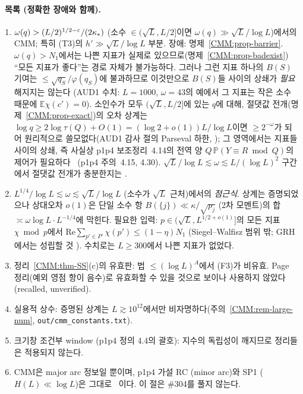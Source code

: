\paragraph{\OPEN\ 목록 (정확한 장애와 함께).}
\begin{enumerate}[label=(O\arabic*),leftmargin=2.5em]
\item $\omega(q)>(L/2)^{1/2-\varepsilon}/(2\kappa_*)$ (소수 $\in(\sqrt L,L/2]$이면 $\omega(q)\gg\sqrt L/\log L$)에서의 CMM; 특히 (T3)의 $h'\gg\sqrt L/\log L$ 부분. 장애: 명제~\ref{CMM:prop-barrier}.
 $\omega(q)>N_1$에서는 나쁜 지표가 실제로 있으므로(명제~\ref{CMM:prop-badexist}) ``모든 지표가 좋다''는 경로 자체가 불가능하다.
 그러나 그런 지표 하나의 $B(S)$ 기여는 $\le\sqrt{q_S}/\varphi(q_S)$에 불과하므로 이것만으로 $B(S)$들 사이의 상쇄가 \emph{필요}해지지는 않는다
 (AUD1 수치: $L=1000$, $\omega=43$의 예에서 그 지표는 작은 소수 때문에 $\mathbb E\chi(c')=0$).
 소인수가 모두 $(\sqrt L,L/2]$에 있는 $q$에 대해, 절댓값 전개(명제~\ref{CMM:prop-exact})의 오차 상계는 $\log q\ge2\log\tau(Q)+O(1)=(\log2+o(1))L/\log L$이면 $\ge2^{-\omega}$가 되어 원리적으로 쓸모없다(AUD1 감사 절의 Parseval 하한, \PROVED);
 그 영역에서는 지표들 사이의 상쇄, 즉 사실상 p1p4 보조정리~4.14의 전역 양 $Q\,\mathbb P(Y\equiv R\bmod Q)$의 제어가 필요하다 \HEUR\ (p1p4 주의~4.15, 4.30).
 $\sqrt L/\log L\lesssim\omega\lesssim L/(\log L)^2$ 구간에서 절댓값 전개가 충분한지는 \OPEN.
\item $L^{1/4}/\log L\lesssim\omega\lesssim\sqrt L/\log L$ (소수가 $\sqrt L$ 근처)에서의 \emph{점근식}. 상계는 증명되었으나 상대오차 $o(1)$은 단일 소수 항
 $B(\{j\})\ll\kappa/\sqrt{p_j}$ (2차 모멘트)의 합 $\asymp\omega\log L\cdot L^{-1/4}$에 막힌다. 필요한 입력: $p\in(\sqrt L,L^{1/2+o(1)}]$의 모든 지표 $\chi\bmod p$에서
 $\mathrm{Re}\sum_{p'\in P'}\chi(p')\le(1-\eta)N_1$ (Siegel--Walfisz 범위 밖; GRH에서는 성립할 것 \HEUR). 수치로는 $L\ge300$에서 나쁜 지표가 없었다.
\item 정리~\ref{CMM:thm-SS}(c)의 유효판: 법 $\le(\log L)^A$에서 (F3)가 비유효. Page 정리(예외 영점 항이 음수)로 유효화할 수 있을 것으로 보이나 사용하지 않았다(recalled, unverified).
\item 실용적 상수: 증명된 상계는 $L\gtrsim10^{12}$에서만 비자명하다(주의~\ref{CMM:rem-large-num}, \texttt{out/cmm\_constants.txt}).
\item 크기창 조건부 window (p1p4 정의 4.4의 괄호): 지수의 독립성이 깨지므로 정리들은 적용되지 않는다.
\item CMM은 major arc 정보일 뿐이며, p1p4 가설 RC (minor arc)와 SP1 ($H(L)\ll\log L$)은 그대로 \OPEN\ 이다. 이 절은 \#304를 풀지 않는다.
\end{enumerate}

